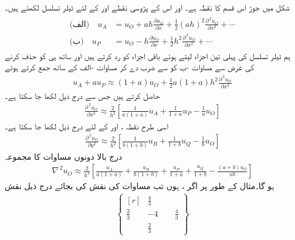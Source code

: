 شکل  میں جوڑ  اس قسم کا نقطہ ہے۔  اور اس کے پڑوسی نقطے  اور  کے لئے ٹیلر تسلسل لکھتے ہیں۔
\begin{gather}
\begin{aligned}\label{مساوات_اعدادی_غیر_ہموار_سرحد_الف}
\text{(الف)}\quad u_A&=u_O+ah\frac{\partial u_O}{\partial x}+\frac{1}{2}(ah)^2\frac{\partial^{\,2}u_O}{\partial x^2}+\cdots\\
\text{(ب)}\quad u_P&=u_O-h\frac{\partial u_O}{\partial x}+\frac{1}{2}h^2\frac{\partial^{\,2}u_O}{\partial x^2}+\cdots
\end{aligned}
\end{gather}
ہم ٹیلر تسلسل کی پہلی تین اجزاء لیتے ہوئے باقی اجزاء  کو رد کرتے ہیں اور ساتھ ہی  کو حذف کرنے کی غرض سے مساوات -ب کو  سے ضرب دے کر مساوات -الف کے ساتھ جمع کرتے ہوئے
\begin{align*}
u_A+au_P\approx (1+a)u_O+\frac{1}{2}a(1+a)h^2\frac{\partial^{\,2}u_O}{\partial x^2}
\end{align*}
حاصل کرتے ہیں جس سے درج ذیل لکھا جا سکتا ہے۔
\begin{align*}
\frac{\partial^{\,2}u_O}{\partial x^2}\approx \frac{2}{h^2}\left[\frac{1}{a(1+a)}u_A+\frac{1}{1+a}u_P-\frac{1}{a}u_O\right]
\end{align*}
اسی طرح نقطہ ،  اور  کے لئے درج ذیل لکھا جا سکتا ہے۔
\begin{align*}
\frac{\partial^{\,2}u_O}{\partial y^2}\approx \frac{2}{h^2}\left[\frac{1}{b(1+b)}u_B+\frac{1}{1+b}u_Q-\frac{1}{b}u_O\right]
\end{align*}
درج بالا دونوں مساوات کا مجموعہ
\begin{align}\label{مساوات_اعدادی_نیبلا_الف}
\nabla^{\,2}u_O\approx \frac{2}{h^2}\left[\frac{u_A}{a(1+a)}+\frac{u_B}{b(1+b)}+\frac{u_P}{1+a}+\frac{u_Q}{1+b}-\frac{(a+b)u_O}{ab}\right]
\end{align}
ہو گا۔مثال کے طور پر اگر ،  ہوں تب مساوات  کی نقش کی بجائے درج ذیل نقش 
\begin{align*}
\left \{ 
\begin{matrix*}[r]
&\frac{4}{3}&\\
\frac{2}{3}&-4&\phantom{-}\frac{4}{3}\\
&\frac{2}{3}&
\end{matrix*}
\right\}
\end{align*}
